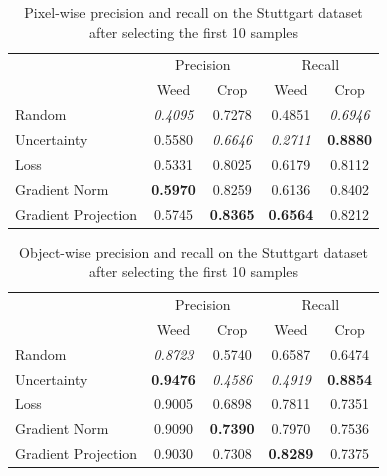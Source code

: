 \documentclass[letterpaper, 10 pt, conference]{ieeeconf}  %
\begin{document}
       \begin{table}
       \vspace{1em}
        \centering
        \caption{Pixel-wise precision and recall on the Stuttgart dataset after selecting the first 10 samples}
        \begin{tabular}{@{}lcccc@{}} 
            \toprule
            & \multicolumn{2}{c}{Precision} & \multicolumn{2}{c}{Recall}\\ 
           \cmidrule{2-5} 
               & Weed & Crop & Weed & Crop \\ 
            \midrule 
    		  Random & \textit{0.4095} & 0.7278 & 0.4851 & \textit{0.6946}  \\ \addlinespace
    		  Uncertainty & 0.5580 & \textit{0.6646} & \textit{0.2711} & \textbf{0.8880}  \\ \addlinespace
    		  Loss & 0.5331 & 0.8025 & 0.6179 & 0.8112  \\ \addlinespace
    		  Gradient Norm & \textbf{0.5970} & 0.8259 & 0.6136 & 0.8402  \\ \addlinespace
    		  Gradient Projection & 0.5745 & \textbf{0.8365} & \textbf{0.6564} & 0.8212  \\ 
            \bottomrule
        \end{tabular}
        \label{tab:pixel_wise_10_stuttgart}
    \end{table}
   
   
   
   
          \begin{table}
        \centering
        \caption{Object-wise precision and recall on the Stuttgart dataset after selecting the first 10 samples}
        \begin{tabular}{@{}lcccc@{}} 
            \toprule
            & \multicolumn{2}{c}{Precision} & \multicolumn{2}{c}{Recall}\\ 
           \cmidrule{2-5} 
               & Weed & Crop & Weed & Crop \\ 
            \midrule 
    		  Random & \textit{0.8723} & 0.5740 & 0.6587 & 0.6474  \\ \addlinespace
    		  Uncertainty & \textbf{0.9476} & \textit{0.4586} & \textit{0.4919} & \textbf{0.8854}  \\ \addlinespace
    		  Loss & 0.9005 & 0.6898 & 0.7811 & 0.7351  \\ \addlinespace
    		  Gradient Norm & 0.9090 & \textbf{0.7390} & 0.7970 & 0.7536  \\ \addlinespace
    		  Gradient Projection & 0.9030 & 0.7308 & \textbf{0.8289} & 0.7375  \\ 
            \bottomrule
        \end{tabular}
        \label{tab:object_wise_10_stuttgart}
    \end{table}
   
\end{document}
